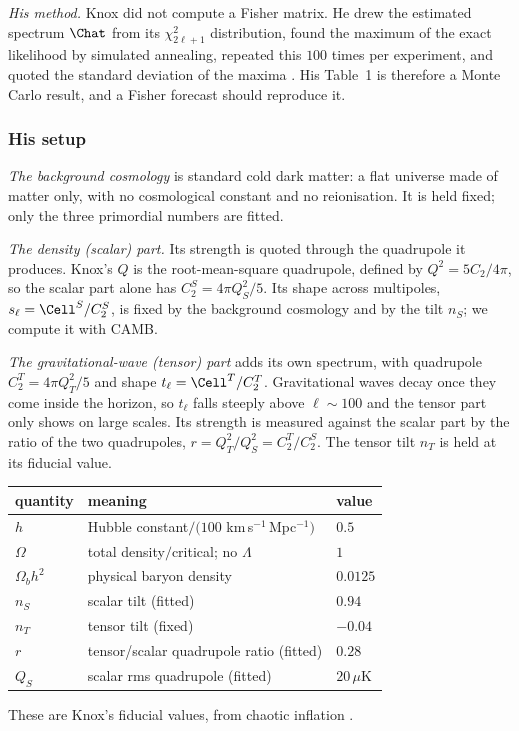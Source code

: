 \emph{His method.} Knox did not compute a Fisher matrix. He drew the estimated spectrum $\Chat$ from its
$\chi^2_{2\ell+1}$ distribution, found the maximum of the exact likelihood by simulated annealing, repeated this
$100$ times per experiment, and quoted the standard deviation of the maxima . His
Table~1 is therefore a Monte Carlo result, and a Fisher forecast should reproduce it.

\subsubsection*{His setup}

\emph{The background cosmology} is standard cold dark matter: a flat universe made of matter only, with no
cosmological constant and no reionisation. It is held fixed; only the three primordial numbers are fitted.

\emph{The density (scalar) part.} Its strength is quoted through the quadrupole it produces. Knox's $Q$ is the
root-mean-square quadrupole, defined by $Q^2=5C_2/4\pi$, so the scalar part alone has $C_2^S=4\pi Q_S^2/5$. Its
shape across multipoles, $s_\ell=\Cell^S/C_2^S$, is fixed by the background cosmology and by the tilt $n_S$; we
compute it with CAMB.

\emph{The gravitational-wave (tensor) part} adds its own spectrum, with quadrupole $C_2^T=4\pi Q_T^2/5$ and shape
$t_\ell=\Cell^T/C_2^T$. Gravitational waves decay once they come inside the horizon, so $t_\ell$ falls steeply above
$\ell\sim100$ and the tensor part only shows on large scales. Its strength is measured against the scalar
part by the ratio of the two quadrupoles, $r=Q_T^2/Q_S^2=C_2^T/C_2^S$. The tensor tilt $n_T$ is held at its fiducial
value.

\begin{center}
\small
\renewcommand{\arraystretch}{1.15}
\begin{tabular}{@{}lll@{}}
\toprule
quantity & meaning & value\\\midrule
$h$ & Hubble constant$/(100$ km\,s$^{-1}$\,Mpc$^{-1})$ & $0.5$\\
$\Omega$ & total density$/$critical; no $\Lambda$ & $1$\\
$\Omega_bh^2$ & physical baryon density & $0.0125$\\
$n_S$ & scalar tilt (fitted) & $0.94$\\
$n_T$ & tensor tilt (fixed) & $-0.04$\\
$r$ & tensor/scalar quadrupole ratio (fitted) & $0.28$\\
$Q_S$ & scalar rms quadrupole (fitted) & $20\,\mu$K\\
\bottomrule
\end{tabular}
\end{center}
These are Knox's fiducial values, from chaotic inflation .

